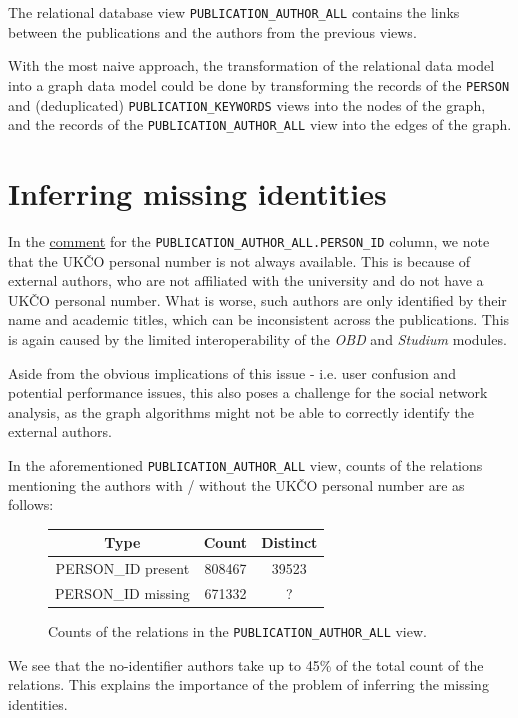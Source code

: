 The relational database view \texttt{PUBLICATION\_AUTHOR\_ALL} contains the links between the publications and the authors from the previous views.

With the most naive approach, the transformation of the relational data model into a graph data model could be done by transforming the records of the 
\texttt{PERSON} and (deduplicated) \texttt{PUBLICATION\_KEYWORDS} views into the nodes of the graph, 
and the records of the \texttt{PUBLICATION\_AUTHOR\_ALL} view into the edges of the graph.

\section{Inferring missing identities}

In the \hyperref[sec:pub-author-all]{comment} for the \texttt{PUBLICATION\_AUTHOR\_ALL.PERSON\_ID} column, we note that the UKČO personal number is not always available.
This is because of external authors, who are not affiliated with the university and do not have a UKČO personal number.
What is worse, such authors are only identified by their name and academic titles, which can be inconsistent across the publications.
This is again caused by the limited interoperability of the \textit{OBD} and \textit{Studium} modules.

Aside from the obvious implications of this issue - i.e. user confusion and potential performance issues,
this also poses a challenge for the social network analysis, as the graph algorithms might not be able 
to correctly identify the external authors.

In the aforementioned \texttt{PUBLICATION\_AUTHOR\_ALL} view, counts of the relations mentioning the authors with / without the UKČO personal number are as follows:

\begin{figure}[!ht]
    \captionsetup{width=.9\linewidth}
    \centering
    \begin{tabular}{|c|c|c|}
    \hline
        Type & Count & Distinct \\ \hline
        PERSON\_ID present & 808467 & 39523 \\ \hline
        PERSON\_ID missing & 671332 & ? \\ \hline
    \end{tabular}
    \caption{Counts of the relations in the \texttt{PUBLICATION\_AUTHOR\_ALL} view.}
\end{figure}

We see that the no-identifier authors take up to 45\% of the total count of the relations.
This explains the importance of the problem of inferring the missing identities.

